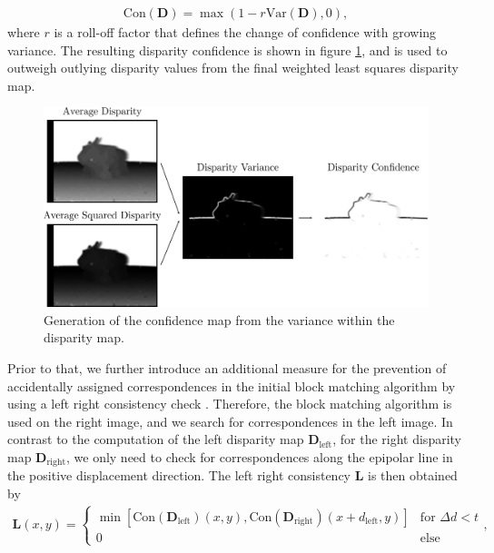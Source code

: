\begin{align}
	\text{Con}(\bm{D}) = \max\left(1-r\text{Var}(\bm{D}),0\right),
\end{align}
where $r$ is a roll-off factor that defines the change of confidence with growing variance. The resulting disparity confidence is shown in figure \ref{fig::323_confidence_map}, and is used to outweigh outlying disparity values from the final weighted least squares disparity map. 
\begin{figure}[h]
	\centering
	\includegraphics[scale=.28]{chapters/03_background/img/confidence_map.png}
	\caption{Generation of the confidence map from the variance within the disparity map.}
	\label{fig::323_confidence_map}
\end{figure}
Prior to that, we further introduce an additional measure for the prevention of accidentally assigned correspondences in the initial block matching algorithm by using a left right consistency check \cite{egnal2004stereo}. Therefore, the block matching algorithm is used on the right image, and we search for correspondences in the left image. In contrast to the computation of the left disparity map $\bm{D}_\text{left}$, for the right disparity map $\bm{D}_\text{right}$, we only need to check for correspondences along the epipolar line in the positive displacement direction. The left right consistency $\bm{L}$ is then obtained by 
\begin{align}
	\bm{L}(x, y) = 
	\begin{cases}
	\min \left[\text{Con}(\bm{D}_\text{left})(x, y), \text{Con}(\bm{D}_\text{right})(x + d_\text{left}, y)\right] & \text{for } \Delta d < t  \\
	0 & \text{else}
	\end{cases},
\end{align}
